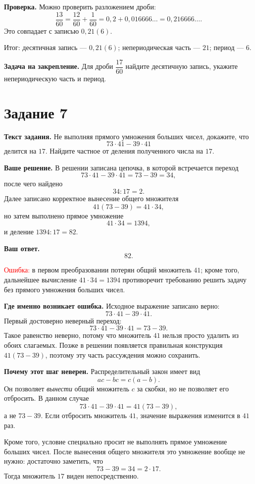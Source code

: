 \documentclass[12pt,a4paper]{article}
\begin{document}
\textbf{Проверка.}
Можно проверить разложением дроби:
\[
\frac{13}{60}=\frac{12}{60}+\frac{1}{60}
=0{,}2+0{,}016666\ldots
=0{,}216666\ldots.
\]
Это совпадает с записью $0{,}21(6)$.

\textcolor{teal!60!black}{Итог:} десятичная запись --- $0{,}21(6)$; непериодическая часть --- $21$; период --- $6$.

\textbf{Задача на закрепление.}
Для дроби $\dfrac{17}{60}$ найдите десятичную запись, укажите непериодическую часть и период.

\newpage
{}\label{task:7}
\section*{Задание 7}

\textbf{Текст задания.}
Не выполняя прямого умножения больших чисел, докажите, что
\[
73\cdot41-39\cdot41
\]
делится на $17$. Найдите частное от деления полученного числа на $17$.

\textbf{Ваше решение.}
В решении записана цепочка, в которой встречается переход
\[
73\cdot41-39\cdot41=73-39=34,
\]
после чего найдено
\[
34:17=2.
\]
Далее записано корректное вынесение общего множителя
\[
41(73-39)=41\cdot34,
\]
но затем выполнено прямое умножение
\[
41\cdot34=1394,
\]
и деление $1394:17=82$.

\textbf{Ваш ответ.}
\[
82.
\]

\textcolor{red}{Ошибка:} в первом преобразовании потерян общий множитель $41$; кроме того, дальнейшее вычисление $41\cdot34=1394$ противоречит требованию решить задачу без прямого умножения больших чисел.

\textbf{Где именно возникает ошибка.}
Исходное выражение записано верно:
\[
73\cdot41-39\cdot41.
\]
Первый достоверно неверный переход:
\[
73\cdot41-39\cdot41=73-39.
\]
Такое равенство неверно, потому что множитель $41$ нельзя просто удалить из обоих слагаемых.
Позже в решении появляется правильная конструкция $41(73-39)$, поэтому эту часть рассуждения можно сохранить.

\textbf{Почему этот шаг неверен.}
Распределительный закон имеет вид
\[
ac-bc=c(a-b).
\]
Он позволяет \emph{вынести} общий множитель $c$ за скобки, но не позволяет его отбросить.
В данном случае
\[
73\cdot41-39\cdot41=41(73-39),
\]
а не $73-39$.
Если отбросить множитель $41$, значение выражения изменится в $41$ раз.

Кроме того, условие специально просит не выполнять прямое умножение больших чисел. После вынесения общего множителя это умножение вообще не нужно: достаточно заметить, что
\[
73-39=34=2\cdot17.
\]
Тогда множитель $17$ виден непосредственно.
\end{document}
